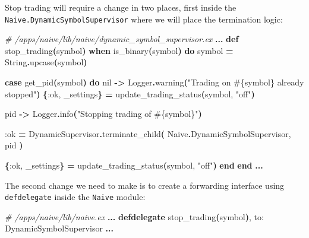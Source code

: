 \documentclass[
  oneside]{book}
\newenvironment{Shaded}{\begin{snugshade}}{\end{snugshade}}
\newcommand{\CommentTok}[1]{\textcolor[rgb]{0.56,0.35,0.01}{\textit{#1}}}
\newcommand{\ConstantTok}[1]{\textcolor[rgb]{0.56,0.35,0.01}{#1}}
\newcommand{\FunctionTok}[1]{\textcolor[rgb]{0.13,0.29,0.53}{\textbf{#1}}}
\newcommand{\KeywordTok}[1]{\textcolor[rgb]{0.13,0.29,0.53}{\textbf{#1}}}
\newcommand{\NormalTok}[1]{#1}
\newcommand{\OperatorTok}[1]{\textcolor[rgb]{0.81,0.36,0.00}{\textbf{#1}}}
\newcommand{\OtherTok}[1]{\textcolor[rgb]{0.56,0.35,0.01}{#1}}
\newcommand{\StringTok}[1]{\textcolor[rgb]{0.31,0.60,0.02}{#1}}
\newcommand{\VariableTok}[1]{\textcolor[rgb]{0.00,0.00,0.00}{#1}}
\begin{document}
Stop trading will require a change in two places, first inside the \texttt{Naive.DynamicSymbolSupervisor} where we will place the termination logic:

\begin{Shaded}
\begin{Highlighting}[]
\CommentTok{\# /apps/naive/lib/naive/dynamic\_symbol\_supervisor.ex}
  \OperatorTok{...}
  \KeywordTok{def}\NormalTok{ stop\_trading}\FunctionTok{(}\NormalTok{symbol}\FunctionTok{)} \KeywordTok{when}\NormalTok{ is\_binary}\FunctionTok{(}\NormalTok{symbol}\FunctionTok{)} \KeywordTok{do}
\NormalTok{    symbol }\OperatorTok{=} \ConstantTok{String}\OperatorTok{.}\NormalTok{upcase}\FunctionTok{(}\NormalTok{symbol}\FunctionTok{)}

    \KeywordTok{case}\NormalTok{ get\_pid}\FunctionTok{(}\NormalTok{symbol}\FunctionTok{)} \KeywordTok{do}
      \ConstantTok{nil} \OperatorTok{{-}\textgreater{}}
        \ConstantTok{Logger}\OperatorTok{.}\NormalTok{warning}\FunctionTok{(}\StringTok{"Trading on }\OtherTok{\#\{}\NormalTok{symbol}\OtherTok{\}}\StringTok{ already stopped"}\FunctionTok{)}
        \FunctionTok{\{}\VariableTok{:ok}\NormalTok{, \_settings}\FunctionTok{\}} \OperatorTok{=}\NormalTok{ update\_trading\_status}\FunctionTok{(}\NormalTok{symbol, }\StringTok{"off"}\FunctionTok{)}

\NormalTok{      pid }\OperatorTok{{-}\textgreater{}}
        \ConstantTok{Logger}\OperatorTok{.}\NormalTok{info}\FunctionTok{(}\StringTok{"Stopping trading of }\OtherTok{\#\{}\NormalTok{symbol}\OtherTok{\}}\StringTok{"}\FunctionTok{)}

        \VariableTok{:ok} \OperatorTok{=}
          \ConstantTok{DynamicSupervisor}\OperatorTok{.}\NormalTok{terminate\_child}\FunctionTok{(}
            \ConstantTok{Naive}\OperatorTok{.}\ConstantTok{DynamicSymbolSupervisor}\NormalTok{,}
\NormalTok{            pid}
          \FunctionTok{)}

        \FunctionTok{\{}\VariableTok{:ok}\NormalTok{, \_settings}\FunctionTok{\}} \OperatorTok{=}\NormalTok{ update\_trading\_status}\FunctionTok{(}\NormalTok{symbol, }\StringTok{"off"}\FunctionTok{)}
    \KeywordTok{end}
  \KeywordTok{end}
  \OperatorTok{...}
\end{Highlighting}
\end{Shaded}

The second change we need to make is to create a forwarding interface using \texttt{defdelegate} inside the \texttt{Naive} module:

\begin{Shaded}
\begin{Highlighting}[]
\CommentTok{\# /apps/naive/lib/naive.ex}
  \OperatorTok{...}
  \KeywordTok{defdelegate}\NormalTok{ stop\_trading}\FunctionTok{(}\NormalTok{symbol}\FunctionTok{)}\NormalTok{, }\VariableTok{to:} \ConstantTok{DynamicSymbolSupervisor}
  \OperatorTok{...}
\end{Highlighting}
\end{Shaded}
\end{document}
